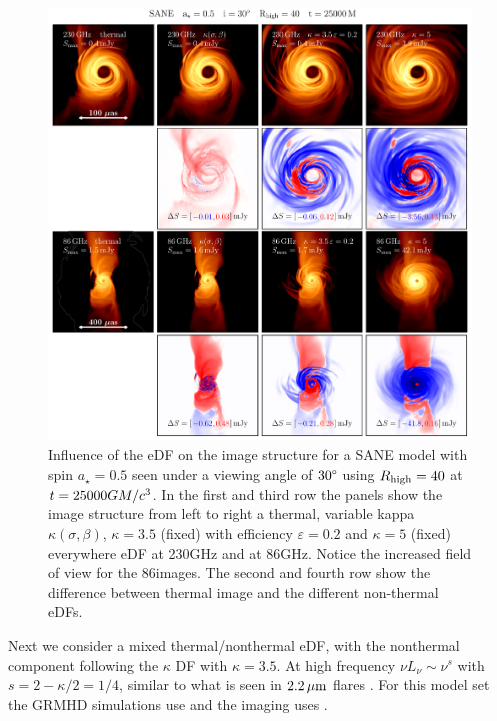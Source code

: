 \begin{figure}
  \centering
  \includegraphics[width=\textwidth]{./figures/SANE_eDFs_diff.pdf}
  \caption{Influence of the eDF on the image structure for a SANE model with spin $a_{\star}=0.5$ seen under a viewing angle of $30\degree$ using $R_\mathrm{high} = 40$ at $t = 25000GM/c^3$.
    In the first and third row the panels show the image structure from left to right a thermal, variable kappa $\kappa(\sigma,\beta)$, $\kappa=3.5$ (fixed) with efficiency $\varepsilon=0.2$ and $\kappa=5$ (fixed) everywhere eDF at 230GHz and at 86GHz.
    Notice the increased field of view for the 86\GHz images.
    The second and fourth row show the difference between thermal image and the different non-thermal eDFs.}
  \label{fig:SANE_edfs}
\end{figure}

Next we consider a mixed thermal/nonthermal eDF, with the nonthermal component following the $\kappa$ DF with $\kappa = 3.5$.
At high frequency $\nu L_\nu \sim \nu^s$ with $s = 2 - \kappa/2 = 1/4$, similar to what is seen in $2.2\,\mu\mathrm{m}$ flares \citep{2007ApJ...667..900H}.
For this model set the GRMHD simulations use \bhac and the imaging uses \bhoss.

